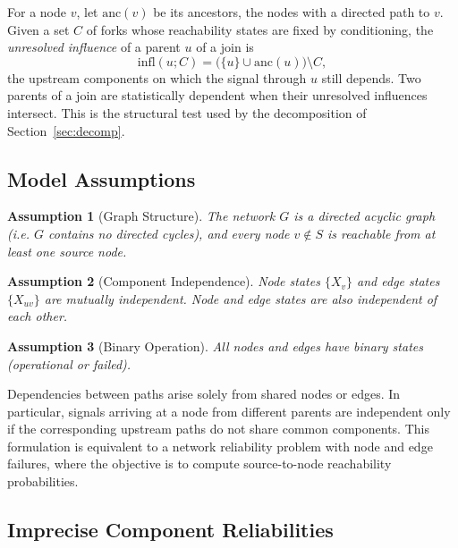 \documentclass[preprint,12pt]{elsarticle}
\newtheorem{assumption}{Assumption}[section]
\begin{document}
For a node $v$, let $\text{anc}(v)$ be its ancestors, the nodes with a directed path to $v$. Given a set $C$ of forks whose reachability states are fixed by conditioning, the \emph{unresolved influence} of a parent $u$ of a join is
\begin{equation}\label{eq:infl}
\text{infl}(u; C) = \bigl( \{u\} \cup \text{anc}(u) \bigr) \setminus C ,
\end{equation}
the upstream components on which the signal through $u$ still depends. Two parents of a join are statistically dependent when their unresolved influences intersect. This is the structural test used by the decomposition of Section~\ref{sec:decomp}.


\subsection{Model Assumptions}

\begin{assumption}[Graph Structure]
The network $G$ is a directed acyclic graph (i.e. $G$ contains no directed cycles), and every node $v \notin S$ is reachable from at least one source node.
\end{assumption}

\begin{assumption}[Component Independence]\label{as:indep}
Node states $\{X_v\}$ and edge states $\{X_{uv}\}$ are mutually independent. Node and edge states are also independent of each other.
\end{assumption}

\begin{assumption}[Binary Operation]
All nodes and edges have binary states (operational or failed).
\end{assumption}

Dependencies between paths arise solely from shared nodes or edges. In particular, signals arriving at a node from different parents are independent only if the corresponding upstream paths do not share common components. This formulation is equivalent to a network reliability problem with node and edge failures, where the objective is to compute source-to-node reachability probabilities.

\subsection{Imprecise Component Reliabilities}\label{subsec:impreciseinputs}
\end{document}
